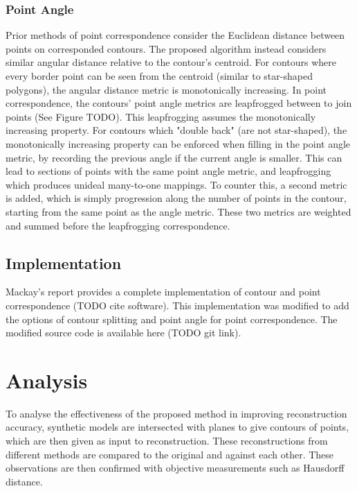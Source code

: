 \documentclass[11p, titlepage]{article}
\begin{document}
\subsubsection{Point Angle}

Prior methods of point correspondence consider the Euclidean distance between points on corresponded contours. The proposed algorithm instead considers similar angular distance relative to the contour's centroid. For contours where every border point can be seen from the centroid (similar to star-shaped polygons), the angular distance metric is monotonically increasing. In point correspondence, the contours' point angle metrics are leapfrogged between to join points (See Figure TODO). This leapfrogging assumes the monotonically increasing property. For contours which "double back" (are not star-shaped), the monotonically increasing property can be enforced when filling in the point angle metric, by recording the previous angle if the current angle is smaller. This can lead to sections of points with the same point angle metric, and leapfrogging which produces unideal many-to-one mappings. To counter this, a second metric is added, which is simply progression along the number of points in the contour, starting from the same point as the angle metric. These two metrics are weighted and summed before the leapfrogging correspondence.

\subsection{Implementation}

Mackay's report provides a complete implementation of contour and point correspondence (TODO cite software). This implementation was modified to add the options of contour splitting and point angle for point correspondence. The modified source code is available here (TODO git link).

\section{Analysis}

To analyse the effectiveness of the proposed method in improving reconstruction accuracy, synthetic models are intersected with planes to give contours of points, which are then given as input to reconstruction. These reconstructions from different methods are compared to the original and against each other. These observations are then confirmed with objective measurements such as Hausdorff distance.
\end{document}
